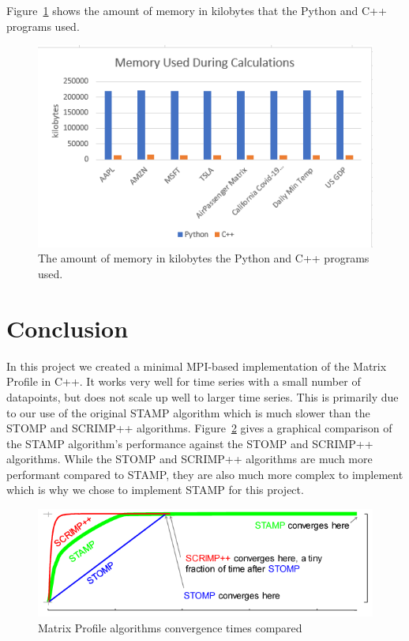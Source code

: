 \documentclass[conference]{IEEEtran}
\begin{document}
Figure~\ref{fig:Memory_Graph} shows the amount of memory in kilobytes that the Python and C++ programs used.

\begin{figure}
\begin{center}
\includegraphics[scale=1.05]{Memory.png}
\caption{The amount of memory in kilobytes the Python and C++ programs used.}
\label{fig:Memory_Graph}
\end{center}
\end{figure}

\section{Conclusion}
In this project we created a minimal MPI-based implementation of the Matrix Profile in C++.  It works very well for time series with a small number of datapoints, but does not scale up well to larger time series.  This is primarily due to our use of the original STAMP algorithm which is much slower than the STOMP and SCRIMP++ algorithms. Figure~\ref{fig:matrix_profile_algorithms_compared} gives a graphical comparison of the STAMP algorithm's performance against the STOMP and SCRIMP++ algorithms.  While the STOMP and SCRIMP++ algorithms are much more performant compared to STAMP, they are also much more complex to implement which is why we chose to implement STAMP for this project. 

\begin{figure}
\begin{center}
\includegraphics[scale=0.85]{matrix_profile_algorithms_compared.png}
\caption{Matrix Profile algorithms convergence times compared}
\label{fig:matrix_profile_algorithms_compared}
\end{center}
\end{figure}
\end{document}
